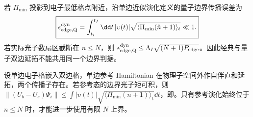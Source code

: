 若 $\Pi_{\min}$ 投影到电子最低格点附近，沿单边近似演化定义的量子边界传播误差为
\begin{equation}
\boxed{
\epsilon_{\rm edge,Q}^{\rm dyn}
=\int_{t_i}^{t_f}\dd t\,|\upsilon(t)|
\sqrt{\langle\Pi_{\min}(\hat n+1)\rangle_t}\ll1.}
\label{eq:quantum_bilateral_ladder_dynamical_error}
\end{equation}
若实际光子数扇区截断在 $n\le N$，则
$\epsilon_{\rm edge,Q}^{\rm dyn}\le\Lambda_I\sqrt{(N+1)P_{\rm edge}}$。因此经典与量子双边延拓不能共用同一个边界判据。

\begin{proposition}[物理格边界的量子传播误差]
设单边电子格嵌入双边格，单边参考 Hamiltonian 在物理子空间外作自伴直和延拓，两个传播子存在。若参考态的边界光子矩可积，则 $\|(U_b-U_s)\Psi_i\|\le\int|\upsilon(t)|\sqrt{\langle\Pi_{\min}(n+1)\rangle_t}\dd t$，即。只有参考演化始终位于 $n\le N$ 时，才能进一步使用有限 $N$ 上界。
\end{proposition}
